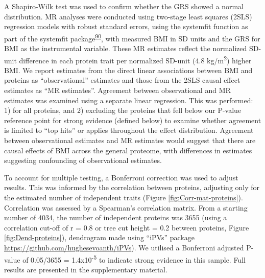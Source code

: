 \documentclass[11pt,twoside]{bristolthesis}
\begin{document}
A Shapiro-Wilk test was used to confirm whether the GRS showed a normal distribution. MR analyses were conducted using two-stage least squares (2SLS) regression models with robust standard errors, using the systemfit function as part of the systemfit package\textsuperscript{\protect\hyperlink{ref-Henningsen2007}{90}}, with measured BMI in SD units and the GRS for BMI as the instrumental variable. These MR estimates reflect the normalized SD-unit difference in each protein trait per normalized SD-unit (4.8 kg/m\textsuperscript{2}) higher BMI. We report estimates from the direct linear associations between BMI and proteins as ``observational'' estimates and those from the 2SLS causal effect estimates as ``MR estimates''. Agreement between observational and MR estimates was examined using a separate linear regression. This was performed: 1) for all proteins, and 2) excluding the proteins that fell below our P-value reference point for strong evidence (defined below) to examine whether agreement is limited to ``top hits'' or applies throughout the effect distribution. Agreement between observational estimates and MR estimates would suggest that there are causal effects of BMI across the general proteome, with differences in estimates suggesting confounding of observational estimates.

To account for multiple testing, a Bonferroni correction was used to adjust results. This was informed by the correlation between proteins, adjusting only for the estimated number of independent traits (Figure \ref{fig:Corr-mat-proteins}). Correlation was assessed by a Spearman's correlation matrix. From a starting number of 4034, the number of independent proteins was 3655 (using a correlation cut-off of r = 0.8 or tree cut height = 0.2 between proteins, Figure \ref{fig:Dend-proteins}), dendrogram made using ``iPVs'' package \url{https://github.com/hughesevoanth/iPVs}). We utilised a Bonferroni adjusted P-value of 0.05/3655 = 1.4x10\textsuperscript{-5} to indicate strong evidence in this sample. Full results are presented in the supplementary material.
\end{document}
